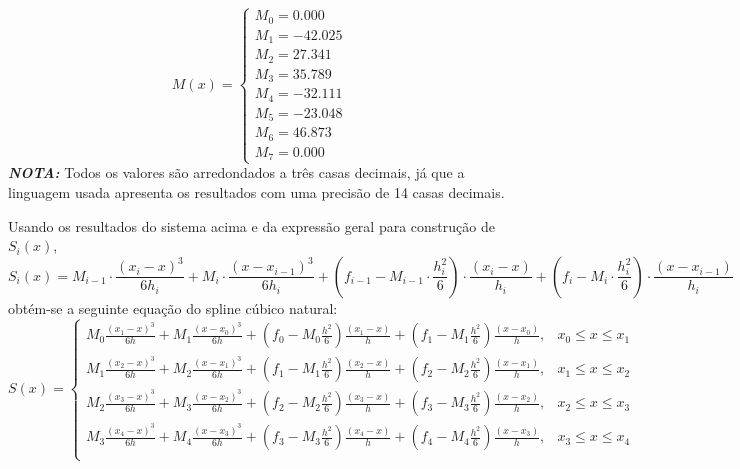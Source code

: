 \documentclass[12pt, letterpaper,fleqn]{article}
\begin{document}
\begin{itemize}
    \begin{equation}
        M(x)=\begin{cases}
            M_0 = 0.000   \\
            M_1 = -42.025 \\
            M_2 = 27.341  \\
            M_3 = 35.789  \\
            M_4 = -32.111 \\
            M_5 = -23.048 \\
            M_6 = 46.873  \\
            M_7 = 0.000       
        \end{cases}
    \end{equation}
    \textbf{\textit{NOTA:}} Todos os valores são arredondados a três casas decimais, já que a linguagem usada apresenta os resultados com uma precisão de 14 casas decimais.
    
    Usando os resultados do sistema acima e da expressão geral para construção de $S_i(x)$,
    \begin{equation}
        S_i(x) = M_{i-1} \cdot \frac{(x_i - x)^3}{6h_i} + M_i \cdot \frac{(x-x_{i-1})^3}{6h_i}+(f_{i-1} - M_{i-1} \cdot \frac{h_i^2}{6})\cdot \frac{(x_i - x)}{h_i} + (f_i - M_i \cdot \frac{h_i^2}{6})\cdot \frac{(x-x_{i-1})}{h_i}
    \end{equation}
    obtém-se a seguinte equação do spline cúbico natural:
    \begin{equation}
        S(x) = \begin{cases}
            M_0\frac{(x_1 - x)^3}{6h} + M_1\frac{(x-x_0)^3}{6h}+(f_0 - M_0\frac{h^2}{6})\frac{(x_1 - x)}{h} + (f_1 - M_1\frac{h^2}{6}) \frac{(x-x_0)}{h}, & x_0 \leq x \leq x_1 \\
            
            M_1\frac{(x_2 - x)^3}{6h} + M_2\frac{(x-x_1)^3}{6h}+(f_1 - M_1\frac{h^2}{6})\frac{(x_2 - x)}{h} + (f_2 - M_2\frac{h^2}{6}) \frac{(x-x_1)}{h}, & x_1 \leq x \leq x_2 \\
            
            M_2\frac{(x_3 - x)^3}{6h} + M_3\frac{(x-x_2)^3}{6h}+(f_2 - M_2\frac{h^2}{6})\frac{(x_3 - x)}{h} + (f_3 - M_3\frac{h^2}{6}) \frac{(x-x_2)}{h}, & x_2 \leq x \leq x_3 \\
            
            M_3\frac{(x_4 - x)^3}{6h} + M_4\frac{(x-x_3)^3}{6h}+(f_3 - M_3\frac{h^2}{6})\frac{(x_4 - x)}{h} + (f_4 - M_4\frac{h^2}{6}) \frac{(x-x_3)}{h}, & x_3 \leq x \leq x_4 \\


\end{cases}
\end{equation}
\end{itemize}
\end{document}

